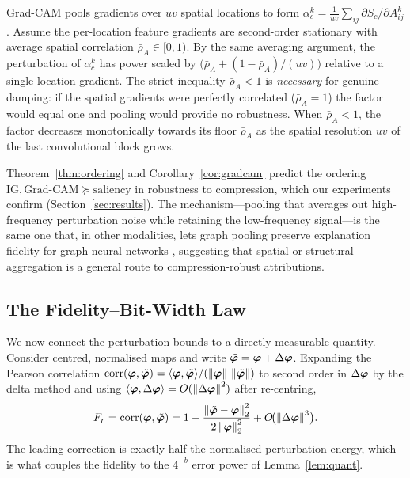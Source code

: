 \begin{corollary}
\label{cor:gradcam}
Grad-CAM pools gradients over $uv$ spatial locations to form
$\alpha_c^k=\tfrac1{uv}\sum_{ij}\partial S_c/\partial A^k_{ij}$. Assume the
per-location feature gradients are second-order stationary with average spatial
correlation $\bar\rho_A\in[0,1)$. By the same averaging argument, the
perturbation of $\alpha_c^k$ has power scaled by
$\bigl(\bar\rho_A+(1-\bar\rho_A)/(uv)\bigr)$ relative to a single-location
gradient. The strict inequality $\bar\rho_A<1$ is \emph{necessary} for genuine
damping: if the spatial gradients were perfectly correlated ($\bar\rho_A=1$) the
factor would equal one and pooling would provide no robustness. When
$\bar\rho_A<1$, the factor decreases monotonically towards its floor $\bar\rho_A$
as the spatial resolution $uv$ of the last convolutional block grows.
\end{corollary}

Theorem~\ref{thm:ordering} and Corollary~\ref{cor:gradcam} predict the ordering
$\text{IG},\text{Grad-CAM}\succeq\text{saliency}$ in robustness to compression,
which our experiments confirm (Section~\ref{sec:results}). The mechanism---pooling
that averages out high-frequency perturbation noise while retaining the
low-frequency signal---is the same one that, in other modalities, lets graph
pooling preserve explanation fidelity for graph neural networks
\cite{yuan2022gnnexplain}, suggesting that spatial or structural aggregation is a
general route to compression-robust attributions.

\subsection{The Fidelity--Bit-Width Law}
We now connect the perturbation bounds to a directly measurable quantity.
Consider centred, normalised maps and write $\tilde{\bm{\varphi}}=\bm{\varphi}+\Delta\bm{\varphi}$.
Expanding the Pearson correlation $\operatorname{corr}(\bm{\varphi},\tilde{\bm{\varphi}})=\langle\bm{\varphi},
\tilde{\bm{\varphi}}\rangle/(\left\lVert\bm{\varphi}\right\rVert\,\left\lVert\tilde{\bm{\varphi}}\right\rVert)$ to second order in
$\Delta\bm{\varphi}$ by the delta method \cite{stewart1990matrix} and using
$\langle\bm{\varphi},\Delta\bm{\varphi}\rangle=O(\left\lVert\Delta\bm{\varphi}\right\rVert^2)$ after re-centring,
\begin{equation}
F_r=\operatorname{corr}(\bm{\varphi},\tilde{\bm{\varphi}})=1-\frac{\left\lVert\tilde{\bm{\varphi}}-\bm{\varphi}\right\rVert_2^2}
{2\left\lVert\bm{\varphi}\right\rVert_2^2}+O\!\bigl(\left\lVert\Delta\bm{\varphi}\right\rVert^3\bigr).
\label{eq:correxp}
\end{equation}
The leading correction is exactly half the normalised perturbation energy, which
is what couples the fidelity to the $4^{-b}$ error power of Lemma~\ref{lem:quant}.

